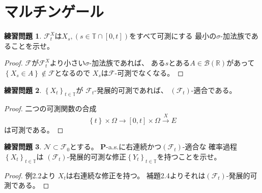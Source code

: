 \documentclass[uplatex]{jsarticle}
\theoremstyle{definition}
\newtheorem{prob}[prob]{練習問題}
\def\R{\mathbb{R}}
\def\P{\mathbf{P}}
\def\T{\mathbb{T}}
\def\mcB{\mathcal{B}}
\def\mcF{\mathcal{F}}
\def\mcN{\mathcal{N}}
\begin{document}
\newpage
\section{マルチンゲール}
\label{section 2}


\begin{prob}\label{prob: 2.1}
  \(\mcF_t^X\)は\(X_s, (s\in\T\cap[0,t])\)をすべて可測にする
  最小の\(\sigma\)-加法族であることを示せ。
\end{prob}

\begin{proof}
  \(\mcF\)が\(\mcF_t^X\)より小さい\(\sigma\)-加法族であれば、
  ある\(s\)とある\(A\in \mcB(\R)\)があって
  \(\left\{X_s\in A\right\}\not\in \mcF\)となるので
  \(X_s\)は\(\mcF\)-可測でなくなる。
\end{proof}














\begin{prob}\label{prob: 2.2}
  \(\left\{X_t\right\}_{t\in \T}\)が
  \(\mcF_t\)-発展的可測であれば、
  \((\mcF_t)\)-適合である。
\end{prob}

\begin{proof}
  二つの可測関数の合成
  \[
  \left\{ t\right\} \times \Omega \to
  [0,t]\times \Omega \xrightarrow{X} E
  \]
  は可測である。
\end{proof}










\begin{prob}\label{prob: 2.3}
  \(\mcN\subset \mcF_0\)とする。
  \(\P\)-a.s.に右連続かつ\((\mcF_t)\)-適合な
  確率過程\(\left\{X_t\right\}_{t\in \T}\)は
  \((\mcF_t)\)-発展的可測な修正\(\left\{Y_t\right\}_{t\in \T}\)を持つことを示せ。
\end{prob}

\begin{proof}
  例2.2より
  \(X_t\)は右連続な修正を持つ。
  補題2.4よりそれは\((\mcF_t)\)-発展的可測である。
\end{proof}
\end{document}
